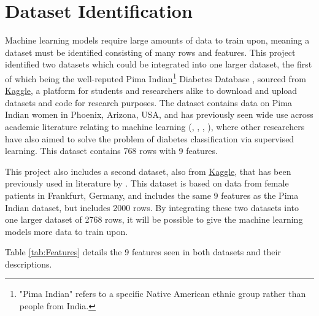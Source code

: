 \documentclass[12pt]{report}
\newcommand{\para}{\vspace{8pt}\noindent}
\begin{document}
\pagebreak 
\section{Dataset Identification}

Machine learning models require large amounts of data to train upon, meaning a dataset must be identified consisting of many 
rows and features. This project identified two datasets which could be integrated into one larger dataset, the first of which being 
the well-reputed Pima Indian\footnote{"Pima Indian" refers to a specific Native American ethnic group rather than people from India.} 
Diabetes Database \autocite{uci_machine_learning_pima_nodate}, sourced from \href{https://www.kaggle.com/datasets/uciml/pima-indians-diabetes-database}{Kaggle}, 
a platform for students and researchers alike to download and upload datasets and code for research purposes. The dataset contains data on Pima Indian women in 
Phoenix, Arizona, USA, and has previously seen wide use across academic literature relating to machine learning (\textcite{alzubi_diabetes_2023}, \textcite{zou_construction_2024}, \textcite{joshi_predicting_2021}, \textcite{hayashi_rule_2016}),
where other researchers have also aimed to solve the problem of diabetes classification via supervised learning. This dataset contains 768 rows with 9 features.

\para
This project also includes a second dataset, also from \href{https://www.kaggle.com/datasets/johndasilva/diabetes/data}{Kaggle}, that has been previously used in literature by 
\textcite{zou_construction_2024}. This dataset \autocite{john_dasilva_frankfurt_nodate} is based on data from female patients in Frankfurt, Germany, and includes the same 9 features as the Pima Indian dataset, but includes 2000 rows. By integrating these two datasets into one larger
dataset of 2768 rows, it will be possible to give the machine learning models more data to train upon.

\para Table \ref{tab:Features} details the 9 features seen in both datasets and their descriptions.
\end{document}
